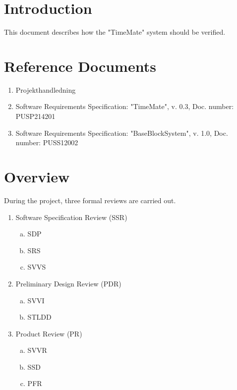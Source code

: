 \documentclass{article}
\date {#1}
\title {
    \documentNumber {02}    
    
    \documentVersion {0.2}
    
    \documentTitle {Software Verification and Validation Specification}
    \documentGroup {2}
    
    \documentResponsible {Test Group}
    \documentAuthors {Test Group}
    
    \documentDate {2021-02-03}
}
\begin{document}
\maketitle
\thispagestyle{empty}

\newpage

\tableofcontents

\newpage


\section{Introduction}

	This document describes how the "TimeMate" system should be verified. 

\section{Reference Documents}

\begin{enumerate}
  \item Projekthandledning 
  \item Software Requirements Specification: "TimeMate", v. 0.3, Doc. number: PUSP214201
  \item Software Requirements Specification: "BaseBlockSystem", v. 1.0, Doc. number: PUSS12002

\end{enumerate}

\section{Overview}
During the project, three formal reviews are carried out.


\begin{enumerate}
	\item Software Specification Review (SSR)
		\begin{enumerate}[a.] 
			\item SDP
			\item SRS 
			\item SVVS 
		\end{enumerate}
	\item Preliminary Design Review (PDR) 
		\begin{enumerate}[a.]
			\item SVVI
			\item STLDD
		\end{enumerate}
	\item Product Review (PR) 
		\begin{enumerate}[a.]
			\item SVVR 
			\item SSD 
			\item PFR 
		\end{enumerate}
\end{enumerate}
\end{document}
